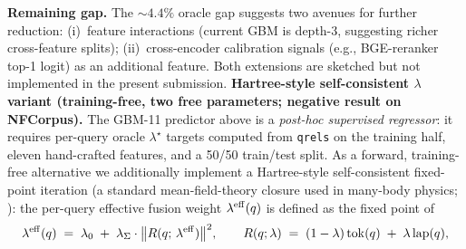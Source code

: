 \documentclass[review,1p]{elsarticle}
\begin{document}
\textbf{Remaining gap.} The $\sim 4.4\%$ oracle gap suggests two avenues for further reduction: (i)~feature interactions (current GBM is depth-3, suggesting richer cross-feature splits); (ii)~cross-encoder calibration signals (e.g., BGE-reranker top-1 logit) as an additional feature. Both extensions are sketched but not implemented in the present submission.
\textbf{Hartree-style self-consistent $\lambda$ variant (training-free, two free parameters; negative result on NFCorpus).} The GBM-11 predictor above is a \emph{post-hoc supervised regressor}: it requires per-query oracle $\lambda^\star$ targets computed from \texttt{qrels} on the training half, eleven hand-crafted features, and a 50/50 train/test split. As a forward, training-free alternative we additionally implement a Hartree-style self-consistent fixed-point iteration (a standard mean-field-theory closure used in many-body physics; \citealp{hartree1928}): the per-query effective fusion weight $\lambda^{\rm eff}(q)$ is defined as the fixed point of
\begin{equation}
\label{eq:hartree-self-consistent}
\lambda^{\rm eff}(q) \;=\; \lambda_0 \;+\; \lambda_\Sigma \cdot \bigl\| R(q;\,\lambda^{\rm eff}) \bigr\|^2, \qquad R(q;\lambda) \;=\; (1-\lambda)\,\mathrm{tok}(q) \;+\; \lambda\,\mathrm{lap}(q),
\end{equation}
\end{document}
